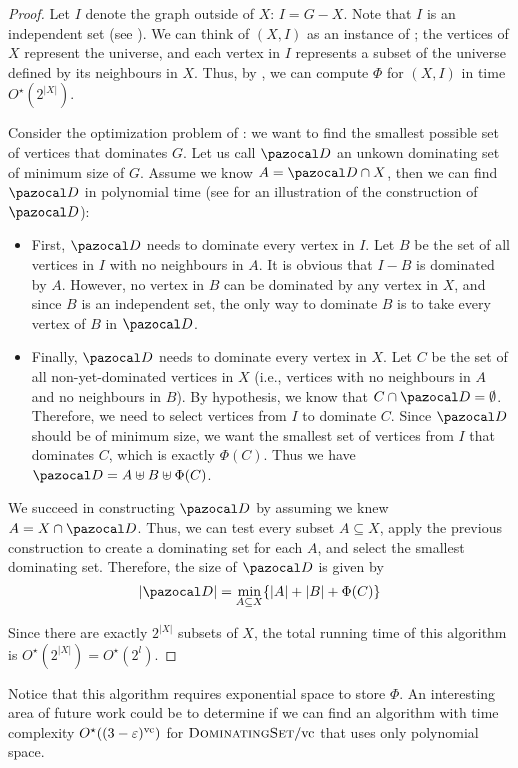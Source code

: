 \begin{proof}
    Let $I$ denote the graph outside of $X$: $I = G - X$. Note that $I$ is an independent set (see ). We can think of $(X, I)$ as an instance of ; the vertices of $X$ represent the universe, and each vertex in $I$ represents a subset of the universe defined by its neighbours in $X$. Thus, by , we can compute $\Phi$ for $(X, I)$ in time $O^\star(2^{|X|})$.

    \medskip
    
    Consider the optimization problem of : we want to find the smallest possible set of vertices that dominates $G$. Let us call $\D$ an unkown dominating set of minimum size of $G$. Assume we know $A = \D \cap X$, then we can find $\D$ in polynomial time (see  for an illustration of the construction of $\D$):
    \begin{itemize}
        \item First, $\D$ needs to dominate every vertex in $I$. Let $B$ be the set of all vertices in $I$ with no neighbours in $A$. It is obvious that $I - B$ is dominated by $A$. However, no vertex in $B$ can be dominated by any vertex in $X$, and since $B$ is an independent set, the only way to dominate $B$ is to take every vertex of $B$ in $\D$.
        \item Finally, $\D$ needs to dominate every vertex in $X$. Let $C$ be the set of all non-yet-dominated vertices in $X$ (i.e., vertices with no neighbours in $A$ and no neighbours in $B$). By hypothesis, we know that $C \cap \D = \emptyset$. Therefore, we need to select vertices from $I$ to dominate $C$. Since $\D$ should be of minimum size, we want the smallest set of vertices from $I$ that dominates $C$, which is exactly $\Phi(C)$. Thus we have $\D = A \uplus B \uplus \Phi(C)$.
    \end{itemize}
    
    \medskip

    We succeed in constructing $\D$ by assuming we knew $A = X \cap \D$. Thus, we can test every subset $A \subseteq X$, apply the previous construction to create a dominating set for each $A$, and select the smallest dominating set. Therefore, the size of $\D$ is given by
    $$|\D| = \min_{A \subseteq X}\{|A| + |B| + \Phi(C)\}$$

    Since there are exactly $2^{|X|}$ subsets of $X$, the total running time of this algorithm is $O^\star(2^{|X|}) = O^\star(2^l)$.
\end{proof}

Notice that this algorithm requires exponential space to store $\Phi$. An interesting area of future work could be to determine if we can find an algorithm with time complexity $O^\star((3 - \varepsilon)^{\text{vc}})$ for $\textsc{DominatingSet}/\text{vc}$ that uses only polynomial space.